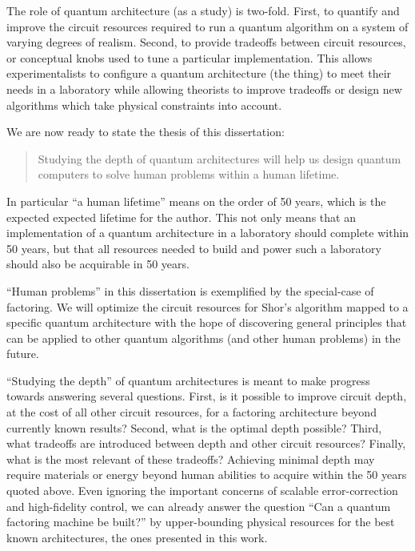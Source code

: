 The role of quantum architecture (as a study) is two-fold. First,
to quantify and improve the circuit resources required to run a quantum
algorithm on a system of varying degrees of realism. Second, to provide
tradeoffs between circuit resources, or conceptual knobs used to tune a
particular implementation. This allows experimentalists to configure a
quantum architecture (the thing) to meet their needs in a laboratory while
allowing theorists to improve tradeoffs or design new algorithms which take
physical constraints into account.

We are now ready to state the thesis of this dissertation:

\begin{quote}
Studying the depth of quantum architectures will help us design quantum
computers to solve
human problems within a human lifetime.
\end{quote}

In particular ``a human lifetime'' means on the order of 50 years, which is
the expected expected lifetime for the author.
This not only means that an implementation of a quantum architecture
in a laboratory should complete within 50 years, but that all resources
needed to build and power such a laboratory should also be acquirable in
50 years.

``Human problems'' in this dissertation is exemplified by the special-case of
factoring. We will optimize the circuit resources for Shor's algorithm mapped
to a specific quantum architecture with the hope of discovering general
principles that can be applied to other quantum algorithms (and other human
problems) in the future.

``Studying the depth'' of quantum architectures is meant to
make progress towards answering several questions.
First, is it possible to improve circuit depth, at the cost of all
other circuit resources, for a factoring architecture
beyond currently known results?
Second, what is the optimal depth possible?
Third, what tradeoffs are introduced between depth and other circuit
resources? Finally, what is the most relevant of these tradeoffs?
Achieving minimal depth may require materials or energy beyond
human abilities to acquire within the 50 years quoted above. Even ignoring the
important concerns of scalable error-correction and high-fidelity control,
we can already answer the question ``Can a quantum factoring machine be built?''
by upper-bounding physical resources for the best known architectures,
the ones presented in this work.

